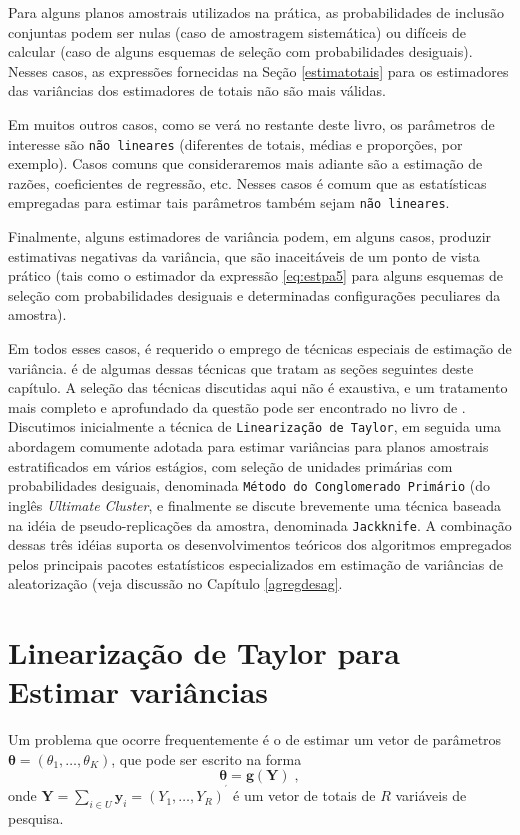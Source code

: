 \documentclass[]{book}
\numberwithin{example}{chapter}
\numberwithin{remark}{chapter}
\numberwithin{definition}{chapter}
\begin{document}
Para alguns planos amostrais utilizados na prática, as probabilidades de
inclusão conjuntas podem ser nulas (caso de amostragem sistemática) ou
difíceis de calcular (caso de alguns esquemas de seleção com
probabilidades desiguais). Nesses casos, as expressões fornecidas na
Seção \ref{estimatotais} para os estimadores das variâncias dos
estimadores de totais não são mais válidas.

Em muitos outros casos, como se verá no restante deste livro, os
parâmetros de interesse são \texttt{não\ lineares} (diferentes de
totais, médias e proporções, por exemplo). Casos comuns que
consideraremos mais adiante são a estimação de razões, coeficientes de
regressão, etc. Nesses casos é comum que as estatísticas empregadas para
estimar tais parâmetros também sejam \texttt{não\ lineares}.

Finalmente, alguns estimadores de variância podem, em alguns casos,
produzir estimativas negativas da variância, que são inaceitáveis de um
ponto de vista prático (tais como o estimador da expressão
\eqref{eq:estpa5} para alguns esquemas de seleção com probabilidades
desiguais e determinadas configurações peculiares da amostra).

Em todos esses casos, é requerido o emprego de técnicas especiais de
estimação de variância. é de algumas dessas técnicas que tratam as
seções seguintes deste capítulo. A seleção das técnicas discutidas aqui
não é exaustiva, e um tratamento mais completo e aprofundado da questão
pode ser encontrado no livro de \citep{W85}. Discutimos inicialmente a
técnica de \texttt{Linearização\ de\ Taylor}, em seguida uma abordagem
comumente adotada para estimar variâncias para planos amostrais
estratificados em vários estágios, com seleção de unidades primárias com
probabilidades desiguais, denominada
\texttt{Método\ do\ Conglomerado\ Primário} (do inglês \emph{Ultimate
Cluster}, e finalmente se discute brevemente uma técnica baseada na
idéia de pseudo-replicações da amostra, denominada \texttt{Jackknife}. A
combinação dessas três idéias suporta os desenvolvimentos teóricos dos
algoritmos empregados pelos principais pacotes estatísticos
especializados em estimação de variâncias de aleatorização (veja
discussão no Capítulo \ref{agregdesag}.

\section{Linearização de Taylor para Estimar variâncias}\label{taylor}

Um problema que ocorre frequentemente é o de estimar um vetor de
parâmetros
\(\mathbf{\theta =}\left( \theta _{1},\ldots ,\theta_{K}\right)\), que
pode ser escrito na forma \[
\mathbf{\theta }=\mathbf{g}(\mathbf{Y})\;, 
\] onde
\(\mathbf{Y}=\sum_{i\in U}\mathbf{y}_{i}=(Y_{1},\ldots ,Y_{R})^{^{\prime}}\)
é um vetor de totais de \(R\) variáveis de pesquisa.
\end{document}
